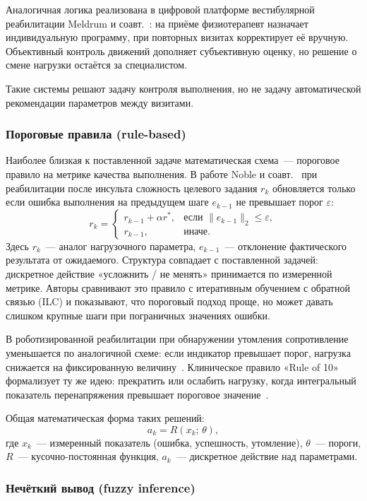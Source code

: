 Аналогичная логика реализована в цифровой платформе вестибулярной
реабилитации Meldrum и соавт.~\cite{meldrum2022}: на приёме физиотерапевт
назначает индивидуальную программу, при повторных визитах корректирует
её вручную. Объективный контроль движений дополняет субъективную оценку,
но решение о смене нагрузки остаётся за специалистом.

Такие системы решают задачу контроля выполнения, но не задачу
автоматической рекомендации параметров между визитами.

\subsubsection{Пороговые правила (rule-based)}

Наиболее близкая к поставленной задаче математическая схема~---
пороговое правило на метрике качества выполнения. В работе Noble и
соавт.~\cite{noble2021} при реабилитации после инсульта сложность
целевого задания $r_k$ обновляется только если ошибка выполнения на
предыдущем шаге $e_{k-1}$ не превышает порог $\varepsilon$:
\[
r_k =
\begin{cases}
r_{k-1} + \alpha r^{*}, & \text{если } \|e_{k-1}\|_2 \leq \varepsilon,\\
r_{k-1}, & \text{иначе.}
\end{cases}
\]
Здесь $r_k$~--- аналог нагрузочного параметра, $e_{k-1}$~--- отклонение
фактического результата от ожидаемого. Структура совпадает с поставленной
задачей: дискретное действие «усложнить / не менять» принимается по
измеренной метрике. Авторы сравнивают это правило с итеративным обучением
с обратной связью (ILC) и показывают, что пороговый подход проще, но
может давать слишком крупные шаги при пограничных значениях ошибки.

В роботизированной реабилитации при обнаружении утомления сопротивление
уменьшается по аналогичной схеме: если индикатор превышает порог,
нагрузка снижается на фиксированную величину~\cite{emg2020}. Клиническое
правило «Rule of 10» формализует ту же идею: прекратить или ослабить
нагрузку, когда интегральный показатель перенапряжения превышает
пороговое значение~\cite{rule10}.

Общая математическая форма таких решений:
\[
a_k = R(x_k;\, \theta),
\]
где $x_k$~--- измеренный показатель (ошибка, успешность, утомление),
$\theta$~--- пороги, $R$~--- кусочно-постоянная функция, $a_k$~---
дискретное действие над параметрами.

\subsubsection{Нечёткий вывод (fuzzy inference)}


